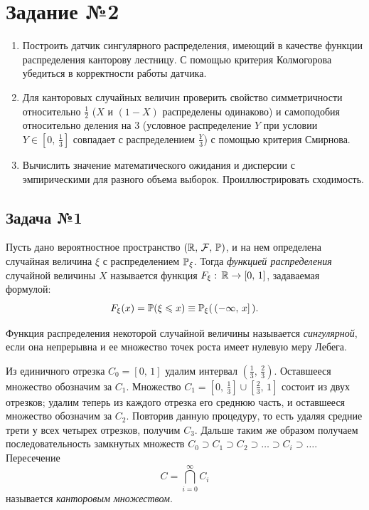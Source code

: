 \section{Задание №2}

\begin{enumerate}
        \item Построить датчик сингулярного распределения, имеющий в качестве функции распределения канторову лестницу. С помощью критерия Колмогорова убедиться в корректности работы датчика.
        \item Для канторовых случайных величин проверить свойство симметричности относительно $\frac12$ ($X$ и $(1 - X)$ распределены одинаково) и самоподобия относительно деления на $3$ (условное распределение $Y$ при условии $Y\in[0,\,\frac13]$ совпадает с распределением $\frac{Y}{3}$) с помощью критерия Смирнова.
        \item Вычислить значение математического ожидания и дисперсии с эмпирическими для разного объема выборок. Проиллюстрировать сходимость.
\end{enumerate}


\subsection{Задача №1}

\begin{definition}
        Пусть дано вероятностное пространство $(\mathbb{R},\, \mathcal{F},\,\mathbb{P})$, и на нем определена случайная величина $\xi$ с распределением $\mathbb{P}_\xi$. Тогда \textit{функцией распределения} случайной величины $X$ называется функция $F_\xi:\,\mathbb{R}\to[0,\,1]$, задаваемая формулой:
        $$
                F_\xi(x) = \mathbb{P}(\xi\leqslant x) \equiv \mathbb{P}_\xi(\,(-\infty,\,x]\,). 
        $$
\end{definition}

\begin{definition}
        Функция распределения некоторой случайной величины называется \textit{сингулярной}, если она непрерывна и ее множество точек роста имеет нулевую меру Лебега.
\end{definition}

\begin{definition}
        Из единичного отрезка $C_0 = [0,\,1]$ удалим интервал $\left(\frac13,\,\frac23\right)$. Оставшееся множество обозначим за $C_1$. Множество $C_1 = \left[0,\,\frac13\right]\cup\left[\frac23,\,1\right]$ состоит из двух отрезков; удалим теперь из каждого отрезка его среднюю часть, и оставшееся множество обозначим за $C_2$. Повторив данную процедуру, то есть удаляя средние трети у всех четырех отрезков, получим $C_3$. Дальше таким же образом получаем последовательность замкнутых множеств $C_0 \supset C_1 \supset C_2 \supset \ldots \supset C_i \supset \ldots$. Пересечение
        $$
                C = \bigcap_{i=0}^{\infty} C_i
        $$
        называется \textit{канторовым множеством}.
\end{definition}

